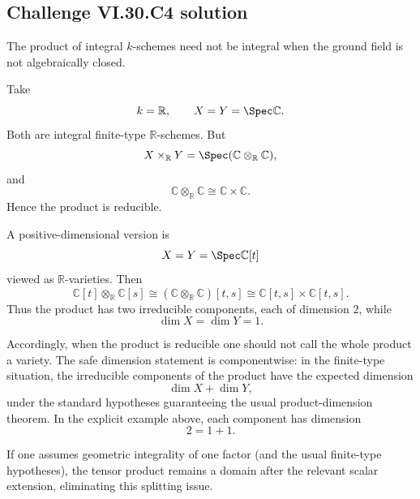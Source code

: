 \subsection*{Challenge VI.30.C4 solution}
\begin{solution}
The product of integral \(k\)-schemes need not be integral when the ground field is not algebraically closed.

Take
\[
k=\mathbb R,
\qquad
X=Y=\Spec\mathbb C.
\]
Both are integral finite-type \(\mathbb R\)-schemes. But
\[
X\times_{\mathbb R}Y
=
\Spec(\mathbb C\otimes_{\mathbb R}\mathbb C),
\]
and
\[
\mathbb C\otimes_{\mathbb R}\mathbb C
\cong
\mathbb C\times\mathbb C.
\]
Hence the product is reducible.

A positive-dimensional version is
\[
X=Y=\Spec\mathbb C[t]
\]
viewed as \(\mathbb R\)-varieties. Then
\[
\mathbb C[t]\otimes_{\mathbb R}\mathbb C[s]
\cong
(\mathbb C\otimes_{\mathbb R}\mathbb C)[t,s]
\cong
\mathbb C[t,s]\times\mathbb C[t,s].
\]
Thus the product has two irreducible components, each of dimension \(2\), while
\[
\dim X=\dim Y=1.
\]

Accordingly, when the product is reducible one should not call the whole product a variety. The safe
dimension statement is componentwise: in the finite-type situation, the irreducible components of the product
have the expected dimension
\[
\dim X+\dim Y,
\]
under the standard hypotheses guaranteeing the usual product-dimension theorem. In the explicit example above,
each component has dimension
\[
2=1+1.
\]

If one assumes geometric integrality of one factor (and the usual finite-type hypotheses), the tensor product
remains a domain after the relevant scalar extension, eliminating this splitting issue.
\end{solution}

